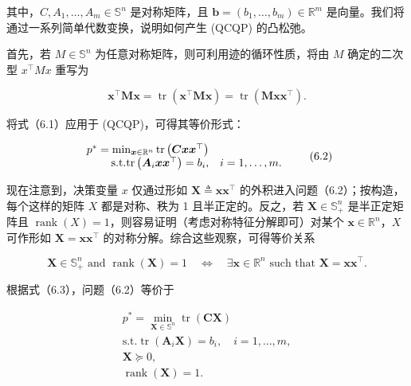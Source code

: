 其中，$C , A _ { 1 } , \ldots , A _ { m } \in \mathbb { S } ^ { n }$ 是对称矩阵，且 $\pmb { b } = ( b _ { 1 } , \dots , b _ { m } ) \in \mathbb { R } ^ { m }$ 是向量。我们将通过一系列简单代数变换，说明如何产生 (QCQP) 的凸松弛。

首先，若 $M \in \mathbb { S } ^ { n }$ 为任意对称矩阵，则可利用迹的循环性质，将由 $M$ 确定的二次型 $x ^ { \top } M x$ 重写为

\begin{equation}
\boldsymbol {x} ^ {\top} \boldsymbol {M} \boldsymbol {x} = \operatorname{tr} \left(\boldsymbol {x} ^ {\top} \boldsymbol {M} \boldsymbol {x}\right) = \operatorname{tr} \left(\boldsymbol {M} \boldsymbol {x} \boldsymbol {x} ^ {\top}\right).\tag{6.1}
\end{equation}

将式（6.1）应用于 (QCQP)，可得其等价形式：

\begin{equation}
\begin{array}{r l} p ^ {*} = \min _ {\boldsymbol {x} \in \mathbb {R} ^ {n}} \mathrm{tr} \left(\boldsymbol {C x x} ^ {\top}\right) \\ \text {s.t.} \mathrm{tr} \left(\boldsymbol {A} _ {i} \boldsymbol {x x} ^ {\top}\right) = b _ {i}, & i = 1, \ldots , m. \end{array}\tag{6.2}
\end{equation}

现在注意到，决策变量 $x$ 仅通过形如 $\pmb { X } \triangleq \pmb { x x } ^ { \top }$ 的外积进入问题（6.2）；按构造，每个这样的矩阵 $X$ 都是对称、秩为 1 且半正定的。反之，若 $\pmb { X } \in \mathbb { S } _ { + } ^ { n }$ 是半正定矩阵且 $\operatorname{rank} ( X ) = 1$，则容易证明（考虑对称特征分解即可）对某个 $\pmb { x } \in \mathbb { R } ^ { n }$，$X$ 可作形如 $\pmb { X } = \pmb { x } \pmb { x } ^ { \top }$ 的对称分解。综合这些观察，可得等价关系

\begin{equation}
\boldsymbol {X} \in \mathbb {S} _ {+} ^ {n} \text { and } \operatorname{rank} (\boldsymbol {X}) = 1 \quad \Longleftrightarrow \quad \exists \boldsymbol {x} \in \mathbb {R} ^ {n} \text { such   that } \boldsymbol {X} = \boldsymbol {x x} ^ {\top}.\tag{6.3}
\end{equation}

根据式（6.3），问题（6.2）等价于

\begin{equation}
\begin{array}{c} p ^ {*} = \min _ {\boldsymbol {X} \in \mathbb {S} ^ {n}} \operatorname{tr} \left(\boldsymbol {C X}\right) \\ \text {s.t.} \operatorname{tr} \left(\boldsymbol {A} _ {i} \boldsymbol {X}\right) = b _ {i}, \quad i = 1, \ldots , m, \\ \boldsymbol {X} \succeq 0, \\ \operatorname{rank} \left(\boldsymbol {X}\right) = 1. \end{array}\tag{6.4}
\end{equation}

